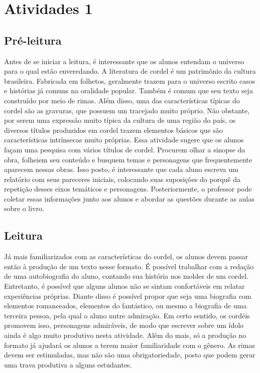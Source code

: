 \documentclass{extarticle}
\begin{document}
\tableofcontents




\section{Atividades 1}


\subsection{Pré-leitura}


Antes de se iniciar a leitura, é interessante que os alunos
entendam o universo para o qual estão enveredando. A literatura de
cordel é um patrimônio da cultura brasileira. Fabricada em folhetos,
geralmente trazem para o universo escrito casos e histórias já comuns na
oralidade popular. Também é comum que seu texto seja construído por meio
de rimas. Além disso, uma das características típicas do cordel são as
gravuras, que possuem um tracejado muito próprio. Não obstante, por
serem uma expressão muito típica da cultura de uma região do país, os
diversos títulos produzidos em cordel trazem elementos básicos que são
características intrínsecas muito próprias. Essa atividade sugere que os
alunos façam uma pesquisa com vários títulos de cordel. Procurem olhar a
sinopse da obra, folheiem seu conteúdo e busquem temas e personagens que
frequentemente aparecem nessas obras. Isso posto, é interessante que
cada aluno escreva um relatório com seus pareceres iniciais, colocando
suas suposições do porquê da repetição desses eixos temáticos e
personagens. Posteriormente, o professor pode coletar essas informações
junto aos alunos e abordar as questões durante as aulas sobre o livro.

\subsection{Leitura}


Já mais familiarizados com as características do cordel, os
alunos devem passar então à produção de um texto nesse formato. É
possível trabalhar com a redação de uma autobiografia do aluno, contando
sua história nos moldes de um cordel. Entretanto, é possível que alguns
alunos não se sintam confortáveis em relatar experiências próprias.
Diante disso é possível propor que seja uma biografia com elementos
romanceados, elementos do fantástico, ou mesmo a biografia de uma
terceira pessoa, pela qual o aluno nutre admiração. Em certo sentido, os
cordéis promovem isso, personagens admiráveis, de modo que escrever
sobre um ídolo ainda é algo muito produtivo nesta atividade. Além do
mais, só a produção no formato já ajudará os alunos a terem maior
familiaridade com o gênero. As rimas devem ser estimuladas, mas não são
uma obrigatoriedade, posto que podem gerar uma trava produtiva a alguns
estudantes.
\end{document}
